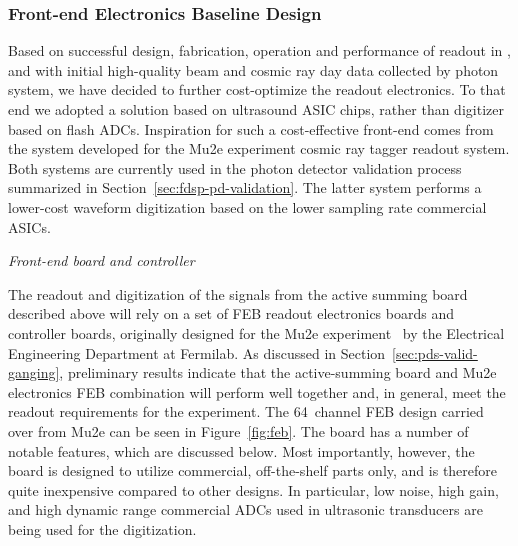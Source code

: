 \subsubsection{Front-end Electronics Baseline Design}
\label{sec:electronics}

Based on successful design, fabrication, operation and performance of  readout in , and with initial high-quality beam and cosmic ray day data collected by  photon system, we have decided to further cost-optimize the readout electronics.  To that end we adopted a solution based on ultrasound ASIC chips, rather than digitizer based on flash ADCs. Inspiration for such a cost-effective front-end comes from the system developed for the Mu2e experiment cosmic ray tagger readout system.
Both systems are currently used in the photon detector validation process summarized in Section~\ref{sec:fdsp-pd-validation}. The latter system performs a lower-cost waveform digitization based on the lower sampling rate commercial ASICs.


\textit{\it Front-end board and controller}

The readout and digitization of the signals from the active summing board described above will rely on a set of FEB readout electronics boards and controller boards, originally designed for the Mu2e experiment~\cite{bib:mu2e_tdr} by the Electrical Engineering Department at Fermilab. As discussed in Section~\ref{sec:pds-valid-ganging}, preliminary results indicate that the active-summing board and Mu2e electronics FEB combination will perform well together and, in general, meet the readout requirements for the experiment. The 64~channel FEB design carried over from Mu2e can be seen in Figure~\ref{fig:feb}. The board has a number of notable features, which are discussed below. Most importantly, however, the board is designed to utilize commercial, off-the-shelf parts only, and is therefore quite inexpensive compared to other designs. In particular, low noise, high gain, and high dynamic range commercial ADCs used in ultrasonic transducers are being used for the digitization.

